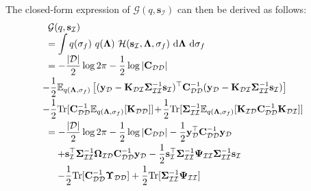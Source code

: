 \documentclass[conference]{IEEEtran}
\begin{document}
	The closed-form expression of $\mathcal{G}(q, \mathbf{s}_\mathcal{I})$ can then be derived as follows:
	\begin{equation*}
		\hspace{-1.7mm}{}
		\begin{array}{l}
			\mathcal{G}(q, \mathbf{s}_\mathcal{I})\\
			\displaystyle=\int q(\sigma_f)\ q(\mathbf{\Lambda})\ \mathcal{H}(\mathbf{s}_\mathcal{I},\mathbf{\Lambda},\sigma_f)\ \mathrm{d}\mathbf{\Lambda}\ \mathrm{d}\sigma_f\\
			\displaystyle=-\frac{|\mathcal{D}|}{2}\log2\pi-\frac{1}{2}\log|\mathbf{C}_\mathcal{DD}|\vspace{1mm}\\
			\displaystyle\hspace{-2mm} -\frac{1}{2}\mathbb{E}_{q(\mathbf{\Lambda},\sigma_f)}\left[(\mathbf{y}_\mathcal{D}-\mathbf{K}_\mathcal{DI}\mathbf{\Sigma}_\mathcal{II}^{-1}\mathbf{s}_\mathcal{I})^\top\mathbf{C}_\mathcal{DD}^{-1}(\mathbf{y}_\mathcal{D}-\mathbf{K}_\mathcal{DI}\mathbf{\Sigma}_\mathcal{II}^{-1}\mathbf{s}_\mathcal{I})\right]\vspace{1mm}\\
			\displaystyle \hspace{-2mm}-\frac{1}{2}\mathrm{Tr}[\mathbf{C}_\mathcal{DD}^{-1}\mathbb{E}_{q(\mathbf{\Lambda},\sigma_f)}[\mathbf{K}_\mathcal{DD}]]\hspace{-0.5mm} +\hspace{-0.5mm}\frac{1}{2}\mathrm{Tr}[\mathbf{\Sigma}_\mathcal{II}^{-1}\mathbb{E}_{q(\mathbf{\Lambda},\sigma_f)}[\mathbf{K}_\mathcal{ID}\mathbf{C}_\mathcal{DD}^{-1}\mathbf{K}_\mathcal{DI}]] \vspace{1mm}\\
			\displaystyle=-\frac{|\mathcal{D}|}{2}\log2\pi-\frac{1}{2}\log|\mathbf{C}_\mathcal{DD}|-\frac{1}{2}\mathbf{y}_\mathcal{D}^\top\mathbf{C}_\mathcal{DD}^{-1}\mathbf{y}_\mathcal{D}\vspace{1mm}\\
			\displaystyle\quad +\mathbf{s}_\mathcal{I}^\top\mathbf{\Sigma}_\mathcal{II}^{-1}\mathbf{\Omega}_\mathcal{ID}\mathbf{C}_\mathcal{DD}^{-1}\mathbf{y}_\mathcal{D}-\frac{1}{2}\mathbf{s}_\mathcal{I}^\top\mathbf{\Sigma}_\mathcal{II}^{-1}\mathbf{\Psi}_\mathcal{II}\mathbf{\Sigma}_\mathcal{II}^{-1}\mathbf{s}_\mathcal{I}\vspace{1mm}\\
			\displaystyle\quad -\frac{1}{2}\mathrm{Tr}[\mathbf{C}_\mathcal{DD}^{-1}\mathbf{\Upsilon}_\mathcal{DD}] +\frac{1}{2}\mathrm{Tr}[\mathbf{\Sigma}_\mathcal{II}^{-1}\mathbf{\Psi}_\mathcal{II}] 
		\end{array}
	\end{equation*}
\end{document}
